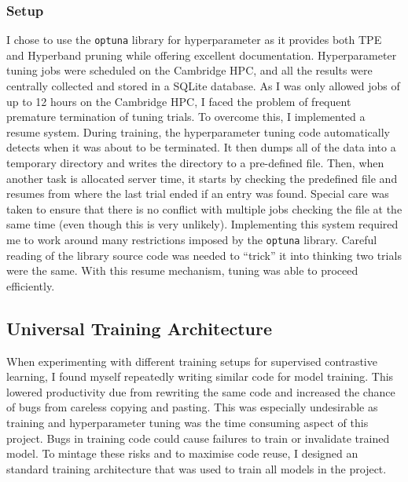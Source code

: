 \documentclass[12pt,a4paper,twoside,openany]{report}
\begin{document}
\subsubsection{Setup}
I chose to use the \verb|optuna| library for hyperparameter as it provides both TPE and Hyperband pruning while offering excellent documentation. 
Hyperparameter tuning jobs were scheduled on the Cambridge HPC, and all the results were centrally collected and stored in a SQLite database. 
As I was only allowed jobs of up to 12 hours on the Cambridge HPC, I faced the problem of frequent premature termination of tuning trials. To overcome this, I implemented a resume system. During training, the hyperparameter tuning code automatically detects when it was about to be terminated. It then dumps all of the data into a temporary directory and writes the directory to a pre-defined file. Then, when another task is allocated server time, it starts by checking the predefined file and resumes from where the last trial ended if an entry was found. Special care was taken to ensure that there is no conflict with multiple jobs checking the file at the same time (even though this is very unlikely). Implementing this system required me to work around many restrictions imposed by the \verb|optuna| library. Careful reading of the library source code was needed to ``trick'' it into thinking two trials were the same. With this resume mechanism, tuning was able to proceed efficiently.

\subsection{Universal Training Architecture}
When experimenting with different training setups for supervised contrastive learning, I found myself repeatedly writing similar code for model training. This lowered productivity due from rewriting the same code and increased the chance of bugs from careless copying and pasting. This was especially undesirable as training and hyperparameter tuning was the time consuming aspect of this project. Bugs in training code could cause failures to train or invalidate trained model. To mintage these risks and to maximise code reuse, I designed an standard training architecture that was used to train all models in the project.
\end{document}

